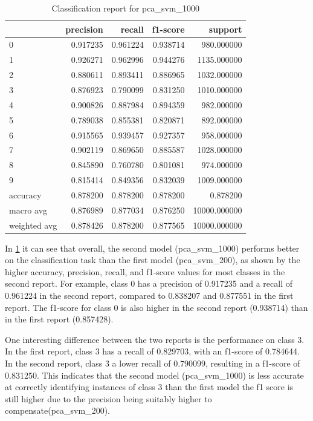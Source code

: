 \begin{table}[htb!]
    \centering
    \begin{tabular}{lrrrr}
        \toprule
        & precision & recall & f1-score & support \\
        \midrule
        0 & 0.917235 & 0.961224 & 0.938714 & 980.000000 \\
        1 & 0.926271 & 0.962996 & 0.944276 & 1135.000000 \\
        2 & 0.880611 & 0.893411 & 0.886965 & 1032.000000 \\
    3 & 0.876923 & 0.790099 & 0.831250 & 1010.000000 \\
    4 & 0.900826 & 0.887984 & 0.894359 & 982.000000 \\
    5 & 0.789038 & 0.855381 & 0.820871 & 892.000000 \\
    6 & 0.915565 & 0.939457 & 0.927357 & 958.000000 \\
    7 & 0.902119 & 0.869650 & 0.885587 & 1028.000000 \\
    8 & 0.845890 & 0.760780 & 0.801081 & 974.000000 \\
    9 & 0.815414 & 0.849356 & 0.832039 & 1009.000000 \\
    accuracy & 0.878200 & 0.878200 & 0.878200 & 0.878200 \\
    macro avg & 0.876989 & 0.877034 & 0.876250 & 10000.000000 \\
    weighted avg & 0.878426 & 0.878200 & 0.877565 & 10000.000000 \\
    \bottomrule
\end{tabular}
\caption{Classification report for pca\_svm\_1000}
\label{tab:classification-report-pca_svm_1000}
    \end{table}

In \ref{tab:classification-report-pca_svm_1000} it can see that overall, the second model (pca\_svm\_1000) performs better on the classification task than the first model (pca\_svm\_200), as shown by the higher accuracy, precision, recall, and f1-score values for most classes in the second report. For example, class 0 has a precision of 0.917235 and a recall of 0.961224 in the second report, compared to 0.838207 and 0.877551 in the first report. The f1-score for class 0 is also higher in the second report (0.938714) than in the first report (0.857428).

One interesting difference between the two reports is the performance on class 3. In the first report, class 3 has a recall of 0.829703, with an f1-score of 0.784644. In the second report, class 3 a lower recall of 0.790099, resulting in a f1-score of 0.831250. This indicates that the second model (pca\_svm\_1000) is less accurate at correctly identifying instances of class 3 than the first model the f1 score is still higher due to the precision being suitably higher to compensate(pca\_svm\_200).

